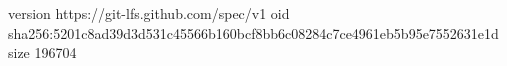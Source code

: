 version https://git-lfs.github.com/spec/v1
oid sha256:5201c8ad39d3d531c45566b160bcf8bb6c08284c7ce4961eb5b95e7552631e1d
size 196704
